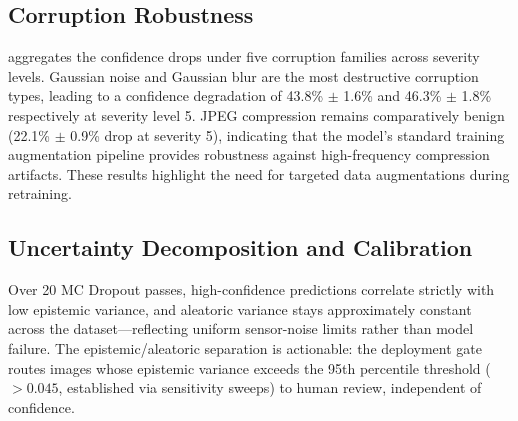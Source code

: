 \documentclass[10pt,twocolumn,letterpaper]{article}
\begin{document}
\subsection{Corruption Robustness}
 aggregates the confidence drops under five corruption families across severity levels. Gaussian noise and Gaussian blur are the most destructive corruption types, leading to a confidence degradation of 43.8\% $\pm$ 1.6\% and 46.3\% $\pm$ 1.8\% respectively at severity level 5. JPEG compression remains comparatively benign (22.1\% $\pm$ 0.9\% drop at severity 5), indicating that the model's standard training augmentation pipeline provides robustness against high-frequency compression artifacts. These results highlight the need for targeted data augmentations during retraining.

\begin{table}[htbp]
\centering
\caption{Confidence drop (\%) by corruption family and severity level (mean $\pm$ std over 3 seeds).}
\label{tab:corruption}
\end{table}

\subsection{Uncertainty Decomposition and Calibration}
Over 20 MC Dropout passes, high-confidence predictions correlate strictly with low epistemic variance, and aleatoric variance stays approximately constant across the dataset---reflecting uniform sensor-noise limits rather than model failure. The epistemic/aleatoric separation is actionable: the deployment gate routes images whose epistemic variance exceeds the 95th percentile threshold ($>0.045$, established via sensitivity sweeps) to human review, independent of confidence. 
\end{document}
